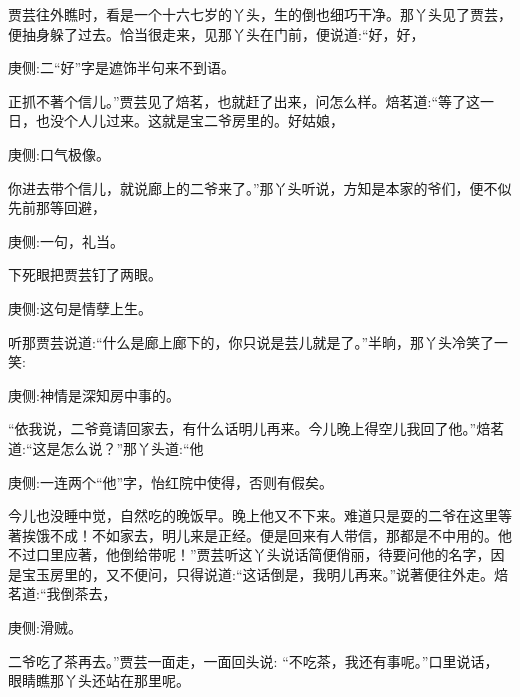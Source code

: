\begin{parag}
    贾芸往外瞧时，看是一个十六七岁的丫头，生的倒也细巧干净。那丫头见了贾芸，便抽身躲了过去。恰当很走来，见那丫头在门前，便说道:“好，好，\begin{note}庚侧:二“好”字是遮饰半句来不到语。\end{note}正抓不著个信儿。”贾芸见了焙茗，也就赶了出来，问怎么样。焙茗道:“等了这一日，也没个人儿过来。这就是宝二爷房里的。好姑娘，\begin{note}庚侧:口气极像。\end{note}你进去带个信儿，就说廊上的二爷来了。”那丫头听说，方知是本家的爷们，便不似先前那等回避，\begin{note}庚侧:一句，礼当。\end{note}下死眼把贾芸钉了两眼。\begin{note}庚侧:这句是情孽上生。\end{note}听那贾芸说道:“什么是廊上廊下的，你只说是芸儿就是了。”半晌，那丫头冷笑了一笑:\begin{note}庚侧:神情是深知房中事的。\end{note}“依我说，二爷竟请回家去，有什么话明儿再来。今儿晚上得空儿我回了他。”焙茗道:“这是怎么说？”那丫头道:“他\begin{note}庚侧:一连两个“他”字，怡红院中使得，否则有假矣。\end{note}今儿也没睡中觉，自然吃的晚饭早。晚上他又不下来。难道只是耍的二爷在这里等著挨饿不成！不如家去，明儿来是正经。便是回来有人带信，那都是不中用的。他不过口里应著，他倒给带呢！”贾芸听这丫头说话简便俏丽，待要问他的名字，因是宝玉房里的，又不便问，只得说道:“这话倒是，我明儿再来。”说著便往外走。焙茗道:“我倒茶去，\begin{note}庚侧:滑贼。\end{note}二爷吃了茶再去。”贾芸一面走，一面回头说: “不吃茶，我还有事呢。”口里说话，眼睛瞧那丫头还站在那里呢。
\end{parag}



